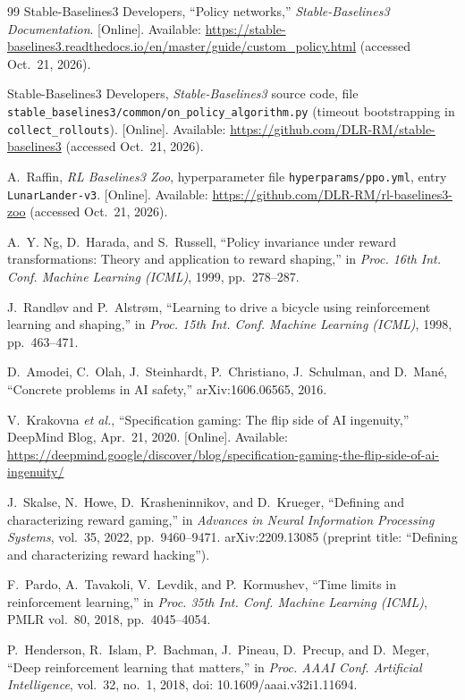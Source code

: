 \documentclass[11pt,a4paper]{article}
\begin{document}
\begin{thebibliography}{99}
 Stable-Baselines3 Developers, ``Policy networks,'' \emph{Stable-Baselines3 Documentation}. [Online]. Available: \url{https://stable-baselines3.readthedocs.io/en/master/guide/custom_policy.html} (accessed Oct.~21, 2026).

 Stable-Baselines3 Developers, \emph{Stable-Baselines3} source code, file \nolinkurl{stable_baselines3/common/on_policy_algorithm.py} (timeout bootstrapping in \texttt{collect\_rollouts}). [Online]. Available: \url{https://github.com/DLR-RM/stable-baselines3} (accessed Oct.~21, 2026).

 A.~Raffin, \emph{RL Baselines3 Zoo}, hyperparameter file \texttt{hyperparams/ppo.yml}, entry \texttt{LunarLander-v3}. [Online]. Available: \url{https://github.com/DLR-RM/rl-baselines3-zoo} (accessed Oct.~21, 2026).

 A.~Y. Ng, D.~Harada, and S.~Russell, ``Policy invariance under reward transformations: Theory and application to reward shaping,'' in \emph{Proc. 16th Int. Conf. Machine Learning (ICML)}, 1999, pp.~278--287.

 J.~Randløv and P.~Alstrøm, ``Learning to drive a bicycle using reinforcement learning and shaping,'' in \emph{Proc. 15th Int. Conf. Machine Learning (ICML)}, 1998, pp.~463--471.

 D.~Amodei, C.~Olah, J.~Steinhardt, P.~Christiano, J.~Schulman, and D.~Mané, ``Concrete problems in AI safety,'' arXiv:1606.06565, 2016.

 V.~Krakovna \emph{et al.}, ``Specification gaming: The flip side of AI ingenuity,'' DeepMind Blog, Apr.~21, 2020. [Online]. Available: \url{https://deepmind.google/discover/blog/specification-gaming-the-flip-side-of-ai-ingenuity/}

 J.~Skalse, N.~Howe, D.~Krasheninnikov, and D.~Krueger, ``Defining and characterizing reward gaming,'' in \emph{Advances in Neural Information Processing Systems}, vol.~35, 2022, pp.~9460--9471. arXiv:2209.13085 (preprint title: ``Defining and characterizing reward hacking'').

 F.~Pardo, A.~Tavakoli, V.~Levdik, and P.~Kormushev, ``Time limits in reinforcement learning,'' in \emph{Proc. 35th Int. Conf. Machine Learning (ICML)}, PMLR vol.~80, 2018, pp.~4045--4054.

 P.~Henderson, R.~Islam, P.~Bachman, J.~Pineau, D.~Precup, and D.~Meger, ``Deep reinforcement learning that matters,'' in \emph{Proc. AAAI Conf. Artificial Intelligence}, vol.~32, no.~1, 2018, doi: 10.1609/aaai.v32i1.11694.


\end{thebibliography}
\end{document}
